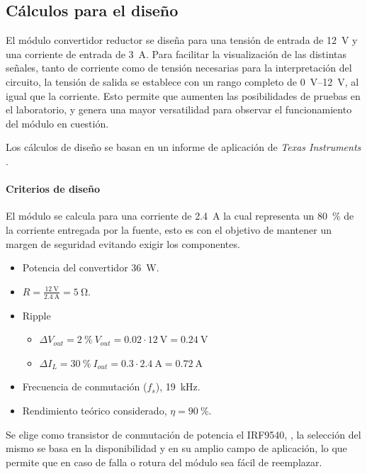 \subsection{Cálculos para el diseño}

El módulo convertidor reductor se diseña para una tensión de entrada de \SI{12}{\volt} y una corriente de entrada de \SI{3}{\ampere}. Para facilitar la visualización de las distintas señales, tanto de corriente como de tensión necesarias para la interpretación del circuito, la tensión de salida se establece con un rango completo de \SIrange{0}{12}{\volt}, al igual que la corriente. Esto permite que aumenten las posibilidades de pruebas en el laboratorio, y genera una mayor versatilidad para observar el funcionamiento del módulo en cuestión.

Los cálculos de diseño se basan en un informe de aplicación de \textit{Texas Instruments} \parencite{ti-buck-report}.

\paragraph{Criterios de diseño}

El módulo se calcula para una corriente de \SI{2,4}{\ampere} la cual representa un \SI{80}{\percent} de la corriente entregada por la fuente, esto es con el objetivo de mantener un margen de seguridad evitando exigir los componentes.

\begin{itemize}[noitemsep]
    \item Potencia del convertidor \SI{36}{\watt}.
    \item $R = \frac{\SI{12}{\volt}}{\SI{2.4}{\ampere}} = \SI{5}{\ohm}$.
    \item Ripple
    \begin{itemize}[noitemsep]
        \item $\Delta V_{out} = \SI{2}{\percent} ~ V_{out} = 0.02 \cdot \SI{12}{\volt} = \SI{0.24}{\volt}$
        \item $\Delta I_L = \SI{30}{\percent} ~ I_{out} = 0.3 \cdot \SI{2.4}{\ampere} = \SI{0.72}{\ampere}$
    \end{itemize}
    \item Frecuencia de conmutación ($f_s$), \SI{19}{\kilo\hertz}.
    \item Rendimiento teórico considerado, $\eta = \SI{90}{\percent}$.
\end{itemize}

Se elige como transistor de conmutación de potencia el IRF9540, \parencite{IRF9540}, la selección del mismo se basa en la disponibilidad y en su amplio campo de aplicación, lo que permite que en caso de falla o rotura del módulo sea fácil de reemplazar.

